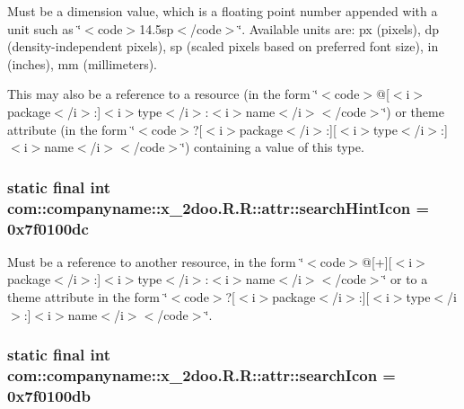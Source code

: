 Must be a dimension value, which is a floating point number appended with a unit such as \char`\"{}$<$code$>$14.5sp$<$/code$>$\char`\"{}. Available units are: px (pixels), dp (density-independent pixels), sp (scaled pixels based on preferred font size), in (inches), mm (millimeters). 

This may also be a reference to a resource (in the form \char`\"{}$<$code$>$@\mbox{[}$<$i$>$package$<$/i$>$:\mbox{]}$<$i$>$type$<$/i$>$:$<$i$>$name$<$/i$>$$<$/code$>$\char`\"{}) or theme attribute (in the form \char`\"{}$<$code$>$?\mbox{[}$<$i$>$package$<$/i$>$:\mbox{]}\mbox{[}$<$i$>$type$<$/i$>$:\mbox{]}$<$i$>$name$<$/i$>$$<$/code$>$\char`\"{}) containing a value of this type. \hypertarget{classcom_1_1companyname_1_1x__2doo_1_1_r_1_1attr_f26e67cf29775451a25cbddd198be891}{
\subsubsection[{searchHintIcon}]{\setlength{\rightskip}{0pt plus 5cm}static final int com::companyname::x\_\-2doo.R.R::attr::searchHintIcon = 0x7f0100dc}}
\label{classcom_1_1companyname_1_1x__2doo_1_1_r_1_1attr_f26e67cf29775451a25cbddd198be891}


Must be a reference to another resource, in the form \char`\"{}$<$code$>$@\mbox{[}+\mbox{]}\mbox{[}$<$i$>$package$<$/i$>$:\mbox{]}$<$i$>$type$<$/i$>$:$<$i$>$name$<$/i$>$$<$/code$>$\char`\"{} or to a theme attribute in the form \char`\"{}$<$code$>$?\mbox{[}$<$i$>$package$<$/i$>$:\mbox{]}\mbox{[}$<$i$>$type$<$/i$>$:\mbox{]}$<$i$>$name$<$/i$>$$<$/code$>$\char`\"{}. \hypertarget{classcom_1_1companyname_1_1x__2doo_1_1_r_1_1attr_b50faccdd8a163ce6488535f51699d2c}{
\subsubsection[{searchIcon}]{\setlength{\rightskip}{0pt plus 5cm}static final int com::companyname::x\_\-2doo.R.R::attr::searchIcon = 0x7f0100db}}
\label{classcom_1_1companyname_1_1x__2doo_1_1_r_1_1attr_b50faccdd8a163ce6488535f51699d2c}


